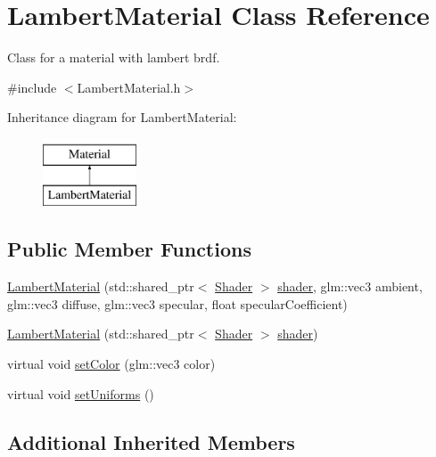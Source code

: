 \hypertarget{class_lambert_material}{}\section{Lambert\+Material Class Reference}
\label{class_lambert_material}


Class for a material with lambert brdf.  




{\ttfamily \#include $<$Lambert\+Material.\+h$>$}

Inheritance diagram for Lambert\+Material\+:\begin{figure}[H]
\begin{center}
\leavevmode
\includegraphics[height=2.000000cm]{class_lambert_material}
\end{center}
\end{figure}
\subsection*{Public Member Functions}
\begin{DoxyCompactItemize}
\item 
\mbox{\hyperlink{class_lambert_material_a0639faca1171374ee0060362e9bcb38d}{Lambert\+Material}} (std\+::shared\+\_\+ptr$<$ \mbox{\hyperlink{class_shader}{Shader}} $>$ \mbox{\hyperlink{class_material_a2528e7055a949798de91d54c259faf1e}{shader}}, glm\+::vec3 ambient, glm\+::vec3 diffuse, glm\+::vec3 specular, float specular\+Coefficient)
\item 
\mbox{\hyperlink{class_lambert_material_af0d314dd4a95407d3aef3310f695ec26}{Lambert\+Material}} (std\+::shared\+\_\+ptr$<$ \mbox{\hyperlink{class_shader}{Shader}} $>$ \mbox{\hyperlink{class_material_a2528e7055a949798de91d54c259faf1e}{shader}})
\item 
virtual void \mbox{\hyperlink{class_lambert_material_a982be68e1db56d7d4980b48172891315}{set\+Color}} (glm\+::vec3 color)
\item 
virtual void \mbox{\hyperlink{class_lambert_material_a2983e583790ba13a782dc49d78358bb7}{set\+Uniforms}} ()
\end{DoxyCompactItemize}
\subsection*{Additional Inherited Members}


